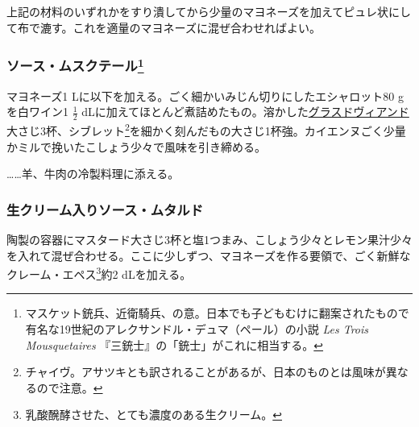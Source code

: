 \begin{recette}
上記の材料のいずれかをすり潰してから少量のマヨネーズを加えてピュレ状にして布で漉す。これを適量のマヨネーズに混ぜ合わせればよい。

\atoaki{}

\hypertarget{sauce-mousquetaire}{%
\subsubsection[ソース・ムスクテール]{\texorpdfstring{ソース・ムスクテール\footnote{マスケット銃兵、近衛騎兵、の意。日本でも子どもむけに翻案されたもので有名な19世紀のアレクサンドル・デュマ（ペール）の小説
  \emph{Les Trois Mousquetaires} 『三銃士』の「銃士」がこれに相当する。}}{ソース・ムスクテール}}\label{sauce-mousquetaire}}



マヨネーズ1 Lに以下を加える。ごく細かいみじん切りにしたエシャロット80 g
を白ワイン1 \(\frac{1}{2}\)
dLに加えてほとんど煮詰めたもの。溶かした\protect\hyperlink{glace-de-viande}{グラスドヴィアンド}大さじ3杯、シブレット\footnote{チャイヴ。アサツキとも訳されることがあるが、日本のものとは風味が異なるので注意。}を細かく刻んだもの大さじ1杯強。カイエンヌごく少量かミルで挽いたこしょう少々で風味を引き締める。

\ldots{}\ldots{}羊、牛肉の冷製料理に添える。

\atoaki{}

\hypertarget{sauce-moutarde-creme}{%
\subsubsection{生クリーム入りソース・ムタルド}\label{sauce-moutarde-creme}}



陶製の容器にマスタード大さじ3杯と塩1つまみ、こしょう少々とレモン果汁少々を入れて混ぜ合わせる。ここに少しずつ、マヨネーズを作る要領で、ごく新鮮なクレーム・エペス\footnote{乳酸醗酵させた、とても濃度のある生クリーム。}約2
dLを加える。


\end{recette}
